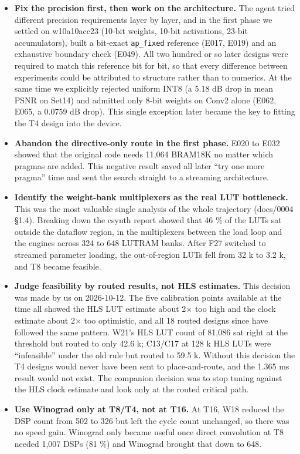 \begin{itemize}
\item \textbf{Fix the precision first, then work on the architecture.} The agent tried different precision requirements layer by layer, and in the first phase we settled on w10a10acc23 (10-bit weights, 10-bit activations, 23-bit accumulators), built a bit-exact \texttt{ap\_fixed} reference (E017, E019) and an exhaustive boundary check (E049). All two hundred or so later designs were required to match this reference bit for bit, so that every difference between experiments could be attributed to structure rather than to numerics. At the same time we explicitly rejected uniform INT8 (a 5.18 dB drop in mean PSNR on Set14) and admitted only 8-bit weights on Conv2 alone (E062, E065, a 0.0759 dB drop). This single exception later became the key to fitting the T4 design into the device.
\item \textbf{Abandon the directive-only route in the first phase.} E020 to E032 showed that the original code needs 11,064 BRAM18K no matter which pragmas are added. This negative result saved all later ``try one more pragma'' time and sent the search straight to a streaming architecture.
\item \textbf{Identify the weight-bank multiplexers as the real LUT bottleneck.} This was the most valuable single analysis of the whole trajectory (docs/0004 \S{}1.4). Breaking down the csynth report showed that 46 \% of the LUTs sat outside the dataflow region, in the multiplexers between the load loop and the engines across 324 to 648 LUTRAM banks. After F27 switched to streamed parameter loading, the out-of-region LUTs fell from 32 k to 3.2 k, and T8 became feasible.
\item \textbf{Judge feasibility by routed results, not HLS estimates.} This decision was made by us on 2026-10-12. The five calibration points available at the time all showed the HLS LUT estimate about 2$\times$ too high and the clock estimate about 2$\times$ too optimistic, and all 18 routed designs since have followed the same pattern. W21's HLS LUT count of 81,086 sat right at the threshold but routed to only 42.6 k; C13/C17 at 128 k HLS LUTs were ``infeasible'' under the old rule but routed to 59.5 k. Without this decision the T4 designs would never have been sent to place-and-route, and the 1.365 ms result would not exist. The companion decision was to stop tuning against the HLS clock estimate and look only at the routed critical path.
\item \textbf{Use Winograd only at T8/T4, not at T16.} At T16, W18 reduced the DSP count from 502 to 326 but left the cycle count unchanged, so there was no speed gain. Winograd only became useful once direct convolution at T8 needed 1,007 DSPs (81 \%) and Winograd brought that down to 648.

\end{itemize}

